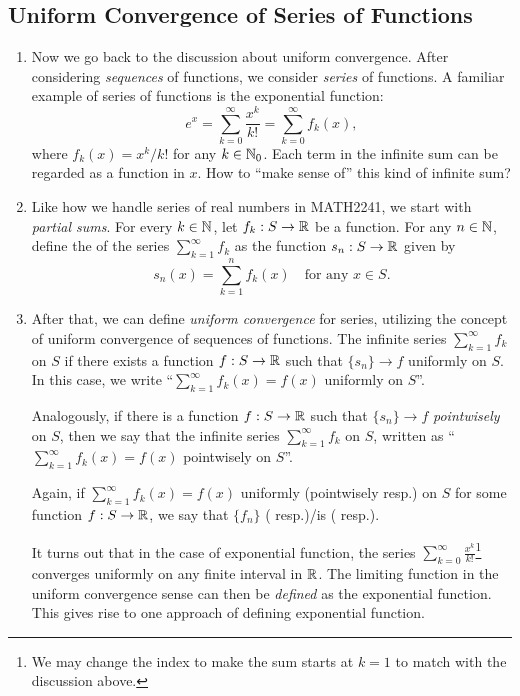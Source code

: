 \subsection{Uniform Convergence of Series of Functions}
\begin{enumerate}
\item Now we go back to the discussion about uniform convergence. After
considering \emph{sequences} of functions, we consider \emph{series} of
functions. A familiar example of series of functions is the exponential
function:
\[
e^{x}=\sum_{k=0}^{\infty}\frac{x^k}{k!}=\sum_{k=0}^{\infty}f_k(x),
\]
where \(f_k(x)=x^k/k!\) for any \(k\in\mathbb{N}_0\). Each term in the infinite sum can
be regarded as a function in \(x\). How to ``make sense of'' this kind of
infinite sum?

\item Like how we handle series of real numbers in MATH2241, we start with
\emph{partial sums}. For every \(k\in\mathbb{N}\), let \(f_k:S\to\mathbb{R}\) be a function.
For any \(n\in\mathbb{N}\), define the  of the series
\(\sum_{k=1}^{\infty}f_k\) as the function \(s_n:S\to\mathbb{R}\) given by
\[
s_n(x)=\sum_{k=1}^{n}f_k(x)\quad\text{for any \(x\in S\)}.
\]

\item After that, we can define \emph{uniform convergence} for series,
utilizing the concept of uniform convergence of sequences of functions. The
infinite series \(\sum_{k=1}^{\infty}f_k\)  on \(S\)
if there exists a function \(f:S\to\mathbb{R}\) such that \(\{s_n\}\to f\) uniformly on
\(S\).  In this case, we write ``\(\sum_{k=1}^{\infty}f_k(x)=f(x)\) uniformly
on \(S\)''.

Analogously, if there is a function \(f:S\to\mathbb{R}\) such that \(\{s_n\}\to f\)
\emph{pointwisely} on \(S\), then we say that the infinite series
\(\sum_{k=1}^{\infty}f_k\)  on \(S\), written as
``\(\sum_{k=1}^{\infty}f_k(x)=f(x)\) pointwisely on \(S\)''.

Again, if \(\sum_{k=1}^{\infty}f_k(x)=f(x)\) uniformly (pointwisely resp.) on
\(S\) for some function \(f:S\to\mathbb{R}\), we say that \(\{f_n\}\)  ( resp.)/is 
( resp.).

It turns out that in the case of exponential function, the series
\(\sum_{k=0}^{\infty}\frac{x^k}{k!}\)\footnote{We may change the index to make
the sum starts at \(k=1\) to match with the discussion above.} converges
uniformly on any finite interval in \(\mathbb{R}\). The limiting function in the
uniform convergence sense can then be \emph{defined} as the exponential
function. This gives rise to one approach of defining exponential function.


\end{enumerate}
